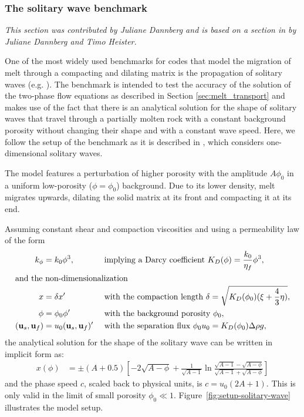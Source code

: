 \documentclass{article}
\begin{document}
\subsubsection{The solitary wave benchmark}
\label{sec:benchmark-solitary_wave}

\textit{This section was contributed by Juliane Dannberg and is based on a section in \cite{dannberg_melt} by Juliane Dannberg and Timo Heister.}

One of the most widely used benchmarks for codes that model the migration of melt through a compacting and dilating matrix is the propagation of solitary waves (e.g. \cite{SS11, KMK2013, Schm00}). 
The benchmark is intended to test the accuracy of the solution of the two-phase flow equations as described in Section \ref{sec:melt_transport} and makes use of the fact that there is an analytical solution for the shape of solitary waves that travel through a partially molten rock with a constant background porosity without changing their shape and with a constant wave speed. 
Here, we follow the setup of the benchmark as it is described in \cite{BR86}, which considers one-dimensional solitary waves.

The model features a perturbation of higher porosity with the amplitude $A \phi_0$ in a uniform low-porosity ($\phi=\phi_0$) background.  Due to its lower density, melt migrates upwards, dilating the solid matrix at its front and compacting it at its end. 

Assuming constant shear and compaction viscosities and using a permeability law of the form
%
\begin{align*}
k_\phi &= k_0 \phi^3, && \text{ implying a Darcy coefficient }
K_D(\phi) = \frac{k_0}{\eta_f} \phi^3 , \\
\intertext{and the non-dimensionalization }
x &= \delta x' 
  && \text{ with the compaction length } \delta = \sqrt{K_D(\phi_0)(\xi + \frac{4}{3}\eta)} , \\
\phi &= \phi_0 \phi ' 
  && \text{ with the background porosity } \phi_0 , \\
(\mathbf u_s, \mathbf u_f) &= u_0 (\mathbf u_s, \mathbf u_f)' 
  && \text{ with the separation flux } \phi_0 u_0 = K_D(\phi_0) \Delta\rho g ,
\end{align*}
%
the analytical solution for the shape of the solitary wave can be written in implicit form as:
\begin{align*}
x(\phi) &= \pm (A + 0.5) 
\left[ -2 \sqrt{A-\phi} + \frac{1}{\sqrt{A-1}} 
\ln \frac{\sqrt{A-1} - \sqrt{A-\phi}}{\sqrt{A-1} + \sqrt{A-\phi}} \right]
\end{align*}
and the phase speed $c$, scaled back to physical units, is $c = u_0 (2A+1)$. 
This is only valid in the limit of small porosity $\phi_0 \ll 1$. Figure~\ref{fig:setup-solitary-wave} illustrates the model setup. 
\end{document}

